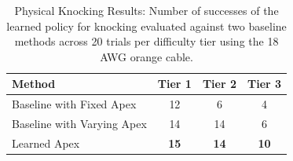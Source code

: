 \begin{table}
\vspace*{4pt}
\centering
\caption{Physical Knocking Results: Number of successes of the learned policy for knocking evaluated against two baseline methods across 20 trials per difficulty tier using the 18 AWG orange cable.}
 \begin{tabular}{ %
l c c c}
 \toprule
  Method & Tier 1 & Tier 2 & Tier 3\\
  \midrule
  Baseline with Fixed Apex &12&6&4\\
  Baseline with Varying Apex &14&14&6\\

  Learned Apex&\textbf{15}&\textbf{14}&\textbf{10}\\
 \bottomrule
\end{tabular}
\label{table:res_task2}
\end{table}